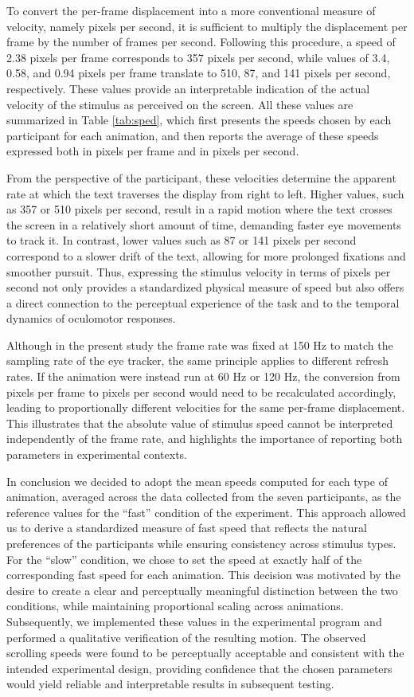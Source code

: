 \documentclass[12pt]{report}
\begin{document}
To convert the per-frame displacement into a more conventional measure of velocity, namely pixels per second, it is sufficient to multiply the displacement per frame by the number of frames per second. 
Following this procedure, a speed of 2.38 pixels per frame corresponds to 357 pixels per second, while values of 3.4, 0.58, and 0.94 pixels per frame translate to 510, 87, and 141 pixels per second, respectively. 
These values provide an interpretable indication of the actual velocity of the stimulus as perceived on the screen.
All these values are summarized in Table \ref{tab:sped}, which first presents the speeds chosen by each participant for each animation, and then reports the average of these speeds expressed both in pixels per frame and in pixels per second.

From the perspective of the participant, these velocities determine the apparent rate at which the text traverses the display from right to left. 
Higher values, such as 357 or 510 pixels per second, result in a rapid motion where the text crosses the screen in a relatively short amount of time, demanding faster eye movements to track it. 
In contrast, lower values such as 87 or 141 pixels per second correspond to a slower drift of the text, allowing for more prolonged fixations and smoother pursuit. 
Thus, expressing the stimulus velocity in terms of pixels per second not only provides a standardized physical measure of speed but also offers a direct connection to the perceptual experience of the task and to the temporal dynamics of oculomotor responses.

Although in the present study the frame rate was fixed at 150 Hz to match the sampling rate of the eye tracker, the same principle applies to different refresh rates. 
If the animation were instead run at 60 Hz or 120 Hz, the conversion from pixels per frame to pixels per second would need to be recalculated accordingly, leading to proportionally different velocities for the same per-frame displacement. 
This illustrates that the absolute value of stimulus speed cannot be interpreted independently of the frame rate, and highlights the importance of reporting both parameters in experimental contexts.

In conclusion we decided to adopt the mean speeds computed for each type of animation, averaged across the data collected from the seven participants, as the reference values for the “fast” condition of the experiment.
This approach allowed us to derive a standardized measure of fast speed that reflects the natural preferences of the participants while ensuring consistency across stimulus types. 
For the “slow” condition, we chose to set the speed at exactly half of the corresponding fast speed for each animation. 
This decision was motivated by the desire to create a clear and perceptually meaningful distinction between the two conditions, while maintaining proportional scaling across animations. 
Subsequently, we implemented these values in the experimental program and performed a qualitative verification of the resulting motion. 
The observed scrolling speeds were found to be perceptually acceptable and consistent with the intended experimental design, providing confidence that the chosen parameters would yield reliable and interpretable results in subsequent testing.
\end{document}
